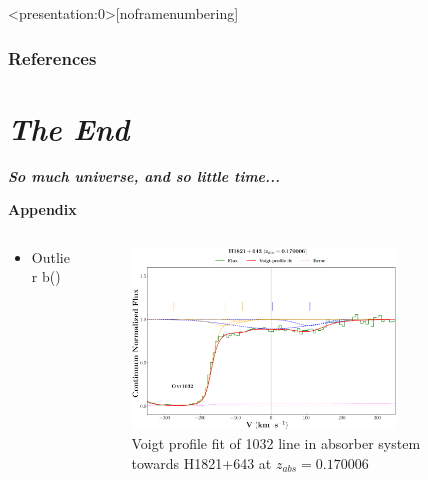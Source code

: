 \documentclass[aspectratio=169,draft]{beamer}
\newcommand\ion[2]{\text{#1\,\textsc{\lowercase{#2}}}}
\begin{document}

\begin{frame}<presentation:0>[noframenumbering]

{\cite{Lehner-2007} \cite{Richter-2006} \cite{savage-2014} \cite{danforth-2016} \cite{acharya_khaire}}
    
\end{frame}
    


\begin{frame}
\renewcommand{\bibfont}{\footnotesize}
\frametitle{\huge{\textbf{References}}}




\end{frame}

\section{\textit{The End}}

\begin{frame}{}
  \centering \Huge
  \textbf{\emph{So much universe, and so little time...}}
\end{frame}


\begin{frame}{\huge{{\textbf{Appendix}}}}

  \begin{columns}
    \begin{column}{0.3\textwidth} 
      \vspace*{-20mm}
    
    \begin{itemize}
      \item Outlier b(\ion{O}{vi})
    \end{itemize}
      
      
    \end{column}      
  
    \begin{column}{0.7\textwidth}
  
      \begin{figure}[!htbp]
        \centering
        \includegraphics[width=7cm]{Figures/H1821+643_z=0.170006_sys_plot.png}
        \vspace*{-1mm}
        \caption{Voigt profile fit of \ion{O}{vi} 1032 line in absorber system towards H1821+643 at $z_{abs}=0.170006$}
      \end{figure}
    \end{column}
  
  \end{columns}

  
\end{frame}


\end{document}

